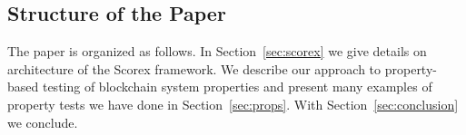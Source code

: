

\subsection{Structure of the Paper}

The paper is organized as follows. In Section~\ref{sec:scorex} we give details on architecture of the Scorex framework. We describe our approach to property-based testing of blockchain system properties and present many examples of property tests we have done in Section~\ref{sec:props}. With Section~\ref{sec:conclusion} we conclude.

